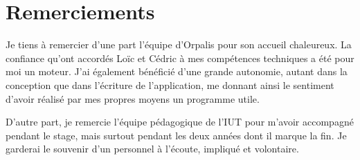 \chapter*{Remerciements}

Je tiens à remercier d'une part l'équipe d'Orpalis pour son accueil chaleureux. La confiance qu'ont accordés Loïc et Cédric à mes compétences techniques a été pour moi un moteur. J'ai également bénéficié d'une grande autonomie, autant dans la conception que dans l'écriture de l'application, me donnant ainsi le sentiment d'avoir réalisé par mes propres moyens un programme utile.

D'autre part, je remercie l'équipe pédagogique de l'IUT pour m'avoir accompagné pendant le stage, mais surtout pendant les deux années dont il marque la fin. Je garderai le souvenir d'un personnel à l'écoute, impliqué et volontaire.